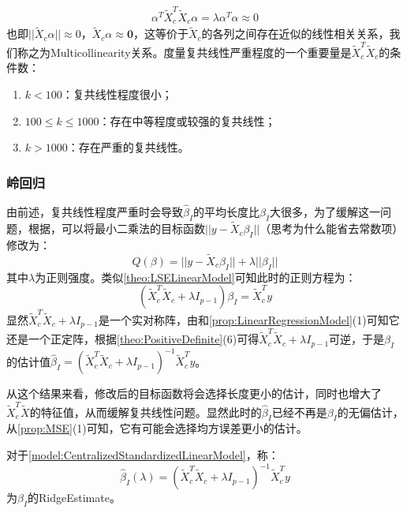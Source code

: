 \begin{note}
\begin{gather*}
		\alpha^T\tilde{X}_c^T\tilde{X}_c\alpha=\lambda\alpha^T\alpha\approx0
	\end{gather*}
	也即$||\tilde{X}_c\alpha||\approx0$，$\tilde{X}_c\alpha\approx\mathbf{0}$，这等价于$\tilde{X}_c$的各列之间存在近似的线性相关关系，我们称之为\gls{Multicollinearity}关系。度量复共线性严重程度的一个重要量是$ \tilde{X}_c^T\tilde{X}_c$的条件数：
	\begin{enumerate}
		\item $k<100$：复共线性程度很小；
		\item $100\leqslant k\leqslant1000$：存在中等程度或较强的复共线性；
		\item $k>1000$：存在严重的复共线性。
	\end{enumerate}
\end{note}
\subsubsection{岭回归}
\begin{note}
	由前述，复共线性程度严重时会导致$\hat{\beta}_I$的平均长度比$\beta_I$大很多，为了缓解这一问题，根据，可以将最小二乘法的目标函数$||y-\tilde{X}_c\beta_I||$（思考为什么能省去常数项）修改为：
	\begin{equation*}
		Q(\beta)=||y-\tilde{X}_c\beta_I||+\lambda||\beta_I||
	\end{equation*}
	其中$\lambda$为正则强度。类似\cref{theo:LSELinearModel}可知此时的正则方程为：
	\begin{equation*}
		(\tilde{X}_c^T\tilde{X}_c+\lambda I_{p-1})\beta_I=\tilde{X}_c^Ty
	\end{equation*}
	显然$\tilde{X}_c^T\tilde{X}_c+\lambda I_{p-1}$是一个实对称阵，由和\cref{prop:LinearRegressionModel}(1)可知它还是一个正定阵，根据\cref{theo:PositiveDefinite}(6)可得$\tilde{X}_c^T\tilde{X}_c+\lambda I_{p-1}$可逆，于是$\beta_I$的估计值$\hat{\beta}_I=(\tilde{X}_c^T\tilde{X}_c+\lambda I_{p-1})^{-1}\tilde{X}_c^Ty$。\par
	从这个结果来看，修改后的目标函数将会选择长度更小的估计，同时也增大了$\tilde{X}_c^T\tilde{X}$的特征值，从而缓解复共线性问题。显然此时的$\hat{\beta}_I$已经不再是$\beta_I$的无偏估计，从\cref{prop:MSE}(1)可知，它有可能会选择均方误差更小的估计。
\end{note}
\begin{definition}
	对于\cref{model:CentralizedStandardizedLinearModel}，称：
	\begin{equation*}
		\hat{\beta}_I(\lambda)=(\tilde{X}_c^T\tilde{X}_c+\lambda I_{p-1})^{-1}\tilde{X}_c^Ty
	\end{equation*}
	为$\beta_I$的\gls{RidgeEstimate}。
\end{definition}